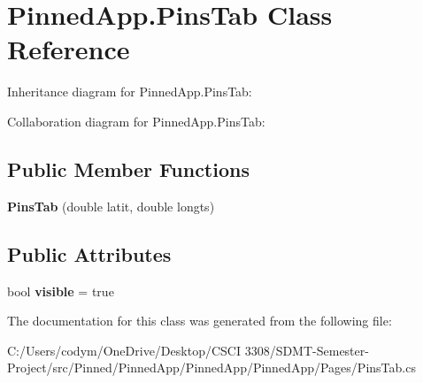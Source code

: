 \hypertarget{class_pinned_app_1_1_pins_tab}{}\section{Pinned\+App.\+Pins\+Tab Class Reference}
\label{class_pinned_app_1_1_pins_tab}


Inheritance diagram for Pinned\+App.\+Pins\+Tab\+:


Collaboration diagram for Pinned\+App.\+Pins\+Tab\+:
\subsection*{Public Member Functions}
\begin{DoxyCompactItemize}
\item 
\mbox{\label{class_pinned_app_1_1_pins_tab_a4bc14a8b733ccc4fb4fa4e5df081aae0}} 
{\bfseries Pins\+Tab} (double latit, double longts)
\end{DoxyCompactItemize}
\subsection*{Public Attributes}
\begin{DoxyCompactItemize}
\item 
\mbox{\label{class_pinned_app_1_1_pins_tab_aa40f6b8e2a2c2c9fce6727866ee51d4c}} 
bool {\bfseries visible} = true
\end{DoxyCompactItemize}


The documentation for this class was generated from the following file\+:\begin{DoxyCompactItemize}
\item 
C\+:/\+Users/codym/\+One\+Drive/\+Desktop/\+C\+S\+C\+I 3308/\+S\+D\+M\+T-\/\+Semester-\/\+Project/src/\+Pinned/\+Pinned\+App/\+Pinned\+App/\+Pinned\+App/\+Pages/Pins\+Tab.\+cs\end{DoxyCompactItemize}
